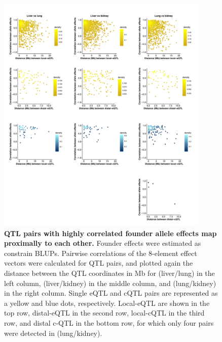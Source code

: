 \documentclass[9pt,twocolumn,twoside]{gsajnl}
\begin{document}
\begin{figure}[hp]
\renewcommand{\familydefault}{\sfdefault}\normalfont
\centering
\includegraphics[width=0.9\textwidth, trim={0in 0in 0in 0in}, clip]{figs/effect_size_cor_by_dist.pdf}
\caption{\textbf{QTL pairs with highly correlated founder allele effects map proximally to each other.} Founder effects were estimated as constrain BLUPs. Pairwise correlations of the 8-element effect vectors were calculated for QTL pairs, and plotted again the distance between the QTL coordinates in Mb for (liver/lung) in the left column, (liver/kidney) in the middle column, and (lung/kidney) in the right column. Single eQTL and cQTL pairs are represented as a yellow and blue dots, respectively. Local-eQTL are shown in the top row, distal-eQTL in the second row, local-cQTL in the third row, and distal c-QTL in the bottom row, for which only four pairs were detected in (lung/kidney).
\label{fig:qtl_cor_by_distance_comparison}}
\end{figure}
\end{document}
